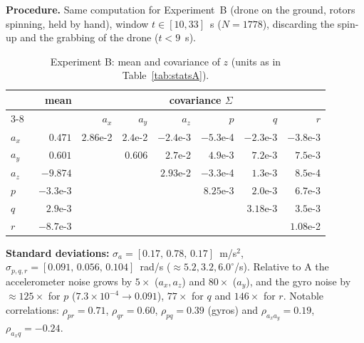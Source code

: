 \textbf{Procedure.} Same computation for Experiment~B (drone on the ground, rotors spinning, held by hand),
window $t\in[10,33]$~s ($N=1778$), discarding the spin-up and the grabbing of the drone ($t<9$~s).

\begin{table}[H]\centering\scriptsize\setlength{\tabcolsep}{4pt}
\caption{Experiment B: mean and covariance of $z$ (units as in Table~\ref{tab:statsA}).}\label{tab:statsB}
\begin{tabular}{l r rrr rrr}\toprule
 & mean & \multicolumn{6}{c}{covariance $\Sigma$}\\\cmidrule(lr){3-8}
 & & $a_x$ & $a_y$ & $a_z$ & $p$ & $q$ & $r$\\\midrule
$a_x$ & $\phantom{-}0.471$ & $2.86$e-2 & $2.4$e-2 & $-2.4$e-3 & $-5.3$e-4 & $-2.3$e-3 & $-3.8$e-3\\
$a_y$ & $\phantom{-}0.601$ & & $0.606$ & $2.7$e-2 & $4.9$e-3 & $7.2$e-3 & $7.5$e-3\\
$a_z$ & $-9.874$ & & & $2.93$e-2 & $-3.3$e-4 & $1.3$e-3 & $8.5$e-4\\
$p$ & $-3.3$e-3 & & & & $8.25$e-3 & $2.0$e-3 & $6.7$e-3\\
$q$ & $\phantom{-}2.9$e-3 & & & & & $3.18$e-3 & $3.5$e-3\\
$r$ & $-8.7$e-3 & & & & & & $1.08$e-2\\\bottomrule
\end{tabular}
\end{table}

\textbf{Standard deviations:} $\sigma_a=[0.17,\,0.78,\,0.17]$~m/s$^2$, $\sigma_{p,q,r}=[0.091,\,0.056,\,0.104]$~rad/s
($\approx5.2,3.2,6.0^\circ$/s). Relative to A the accelerometer noise grows by $5\times$ ($a_x,a_z$) and $80\times$ ($a_y$), and
the gyro noise by $\approx125\times$ for $p$ ($7.3\times10^{-4}\to0.091$), $77\times$ for $q$ and $146\times$ for $r$. Notable correlations:
$\rho_{pr}=0.71$, $\rho_{qr}=0.60$, $\rho_{pq}=0.39$ (gyros) and $\rho_{a_xa_y}=0.19$, $\rho_{a_xq}=-0.24$.

